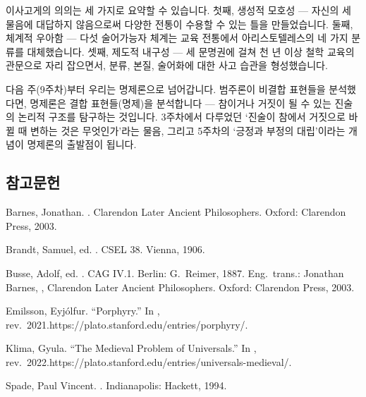 \documentclass[12pt, a4paper]{article}
\begin{document}
이사고게의 의의는 세 가지로 요약할 수 있습니다. 첫째, 생성적 모호성 --- 자신의 세 물음에 대답하지 않음으로써 다양한 전통이 수용할 수 있는 틀을 만들었습니다. 둘째, 체계적 우아함 --- 다섯 술어가능자 체계는 교육 전통에서 아리스토텔레스의 네 가지 분류를 대체했습니다. 셋째, 제도적 내구성 --- 세 문명권에 걸쳐 천 년 이상 철학 교육의 관문으로 자리 잡으면서, 분류, 본질, 술어화에 대한 사고 습관을 형성했습니다.

다음 주(9주차)부터 우리는 명제론으로 넘어갑니다. 범주론이 비결합 표현들을 분석했다면, 명제론은 결합 표현들(명제)을 분석합니다 --- 참이거나 거짓이 될 수 있는 진술의 논리적 구조를 탐구하는 것입니다. 3주차에서 다루었던 `진술이 참에서 거짓으로 바뀔 때 변하는 것은 무엇인가'라는 물음, 그리고 5주차의 `긍정과 부정의 대립'이라는 개념이 명제론의 출발점이 됩니다.

\subsection*{참고문헌}
\begin{references}

 Barnes, Jonathan. . Clarendon Later Ancient Philosophers. Oxford: Clarendon Press, 2003.

 Brandt, Samuel, ed. . CSEL 38. Vienna, 1906.

 Busse, Adolf, ed. . CAG IV.1. Berlin: G.\ Reimer, 1887. Eng.\ trans.: Jonathan Barnes, , Clarendon Later Ancient Philosophers. Oxford: Clarendon Press, 2003.

 Emilsson, Eyjólfur. ``Porphyry.'' In , rev.\ 2021.\newline https://plato.stanford.edu/entries/porphyry/.

 Klima, Gyula. ``The Medieval Problem of Universals.'' In , rev.\ 2022.\newline https://plato.stanford.edu/entries/universals-medieval/.

 Spade, Paul Vincent. . Indianapolis: Hackett, 1994.

\end{references}
\end{document}
